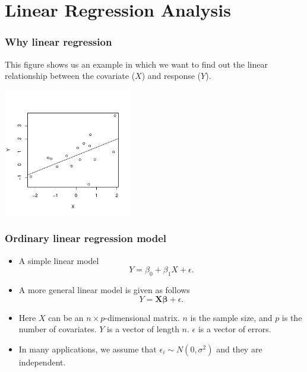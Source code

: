 \section{Linear Regression Analysis}

\begin{frame}
  \frametitle{Why linear regression}
  This figure shows us an example in which we want to find out the
  \alert{linear relationship} between the covariate ($X$) and response
  ($Y$).
  \begin{center}
    \includegraphics[height=2.2in]{lm-plot}
  \end{center}
\end{frame}

\begin{frame}
  \frametitle{Ordinary linear regression model}
  \begin{itemize}
  \item A simple linear model
    \begin{equation}
      \label{eq:simple-lin}
      Y = \beta_{0} + \beta_{1} X + \epsilon.
    \end{equation}
  \item A more general linear model is given as follows
    \begin{equation}
      \label{eq:lin}
      Y = \mathbf{X} \bm{\beta} + \epsilon.
    \end{equation}
  \item Here $X$ can be an $n\times p$-dimensional matrix. $n$ is the
    sample size, and $p$ is the number of covariates.  $Y$ is a vector
    of length $n$.  $\epsilon$ is a vector of errors.
  \item In many applications, we assume that $\epsilon_{i} \sim N(0,
    \sigma^{2})$ and they are independent.
  \end{itemize}
\end{frame}

